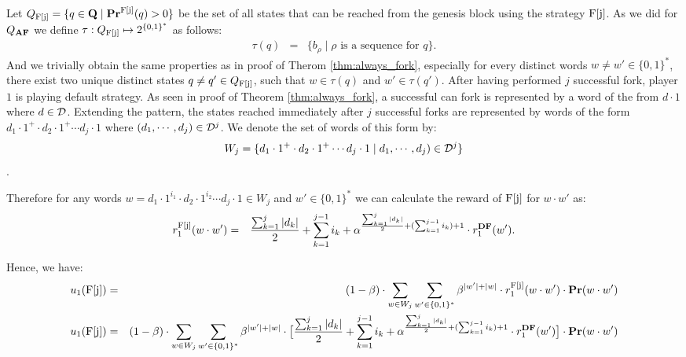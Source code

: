 Let $Q_{\text{\rm F[{j}]}} = \{q \in \mathbf{Q} \mid \mathbf{Pr}^{\text{\rm F[{j}]}}(q) > 0\}$ be the set of all states that can be reached from the genesis block using the strategy $\text{\rm F[{j}]}$. As we did for $Q_{\text{\rm {\bf AF}}}$ we define $\tau:Q_{\text{\rm F[{j}]}} \mapsto 2^{\{0,1\}^*}$ as follows:
\begin{eqnarray*}
\tau(q) & = & \{ b_\rho \mid \rho \text{ is a sequence for } q\}.
\end{eqnarray*}
And we trivially obtain the same properties as in proof of Therom \ref{thm:always_fork}, especially for every distinct words $w \neq w' \in \{0, 1\} ^*$, there exist two unique distinct states $q \neq q' \in Q_{\text{\rm F[{j}]}}$,  such that $w \in \tau(q)$ and $w' \in \tau(q')$.
After having performed $j$ successful fork, player $1$ is playing default strategy. As seen in proof of Theorem \ref{thm:always_fork}, a successful can fork is represented by a word of the from $d\cdot 1$ where $d \in \mathcal{D}$. Extending the pattern, the states reached immediately after $j$ successful forks are represented by words of the form $d_1 \cdot 1^+ \cdot d_2 \cdot 1^+ \cdots d_j \cdot 1$ where $(d_1, \cdots, d_j) \in \mathcal{D}^j$. We denote the set of words of this form by:
\begin{equation*}W_j = \{d_1 \cdot 1^+ \cdot d_2 \cdot 1^+ \cdots d_j \cdot 1 \mid d_1, \cdots, d_j) \in \mathcal{D}^j\}
\end{equation*}.

Therefore for any words $w = d_1 \cdot 1^{i_1} \cdot d_2 \cdot 1^{i_2} \cdots d_j \cdot 1 \in W_j$ and $w' \in \{0, 1\} ^*$ we can calculate the reward of $\text{\rm F[{j}]}$ for $w\cdot w'$ as:
\begin{eqnarray*}
r^{\text{\rm F[{j}]}}_1(w\cdot w') & = & \frac{\sum_{k=1}^{j} |d_k|}{2}+\sum_{k=1}^{j-1} i_k + \alpha^{\frac{\sum_{k=1}^{j} |d_k|}{2}+(\sum_{k=1}^{j-1} i_k) +1}\cdot r_1^{\text{\rm {\bf DF}}}(w').
\end{eqnarray*}

Hence, we have:
\begin{eqnarray*}
u_1(\text{\rm F[{j}]})& = & (1-\beta)\cdot\sum_{w \in W_j}  \sum_{w'\in \{0,1\}^*}\beta^{|w'|+|w|}\cdot r^{\text{\rm F[{j}]}}_1(w\cdot w') \cdot \mathbf{Pr}(w\cdot w')\\
u_1(\text{\rm F[{j}]}) & = & (1-\beta)\cdot\sum_{w \in W_j}  \sum_{w'\in \{0,1\}^*}\beta^{|w'|+|w|}\cdot \big[ \frac{\sum_{k=1}^{j} |d_k|}{2}+\sum_{k=1}^{j-1} i_k + \alpha^{\frac{\sum_{k=1}^{j} |d_k|}{2}+(\sum_{k=1}^{j-1} i_k) +1}\cdot r_1^{\text{\rm {\bf DF}}}(w') \big] \cdot \mathbf{Pr}(w\cdot w')
\end{eqnarray*}

